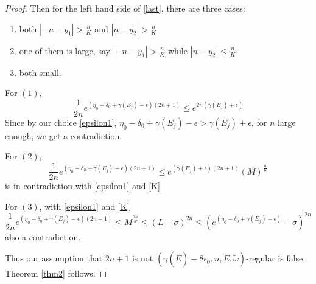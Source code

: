 \begin{proof}
Then for the left hand side of \eqref{last}, there are three cases:
\begin{enumerate}
  \item both $|-n-y_{1}|>\frac{n}{K}$ and $|n-y_{2}|>\frac{n}{K}$
  \item one of them is large, say $|-n-y_{1}|>\frac{n}{K}$ while $|n-y_{2}|\leq\frac{n}{K}$
  \item both small.
\end{enumerate}

For $(1)$,
\[
\frac{1}{2n}e^{(\eta_0-\delta_0+\gamma(E_j)-\epsilon)(2n+1)}\leq e^{2n(\gamma(E_j)+\epsilon)}
\]
Since by our choice \eqref{epsilon1},
 $\eta_0-\delta_0+\gamma(E_j)-\epsilon>\gamma(E_j)+\epsilon$, for $n$ large enough, we get a contradiction.

For $(2)$,
\[
    \frac{1}{2n}e^{(\eta_0-\delta_0+\gamma(E_j)-\epsilon)(2n+1)}
    \leq e^{(\gamma(E_j)+\epsilon)(2n+1)}(M)^{\frac{n}{K}}
\]
is in contradiction with \eqref{epsilon1} and \eqref{K}

For $(3)$, with \eqref{epsilon1} and \eqref{K}
\[
  \frac{1}{2n}e^{(\eta_0-\delta_0+\gamma(E_j)-\epsilon)(2n+1)}\leq M^{\frac{2n}{K}}\leq (L-\sigma)^{2n}\leq(e^{(\eta_0-\delta_0+\gamma(E_j)-\epsilon)}-\sigma)^{2n}
\]
also a contradiction.

Thus our assumption that $2n+1$ is not  $(\gamma(\tilde{E})-8\epsilon_0,n,\tilde{E},\tilde{\omega})$-regular is false. Theorem \ref{thm2} follows.
\end{proof}
